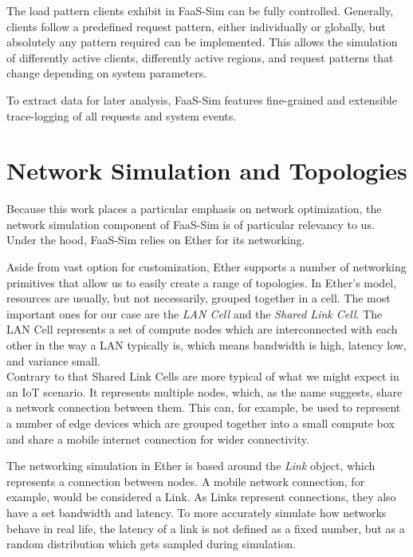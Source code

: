 \documentclass[draft,final]{vutinfth} %
\begin{document}
The load pattern clients exhibit in FaaS-Sim can be fully controlled.
Generally, clients follow a predefined request pattern, either individually or globally, but absolutely any pattern required can be implemented.
This allows the simulation of differently active clients, differently active regions, and request patterns that change depending on system parameters.

To extract data for later analysis, FaaS-Sim features fine-grained and extensible trace-logging of all requests and system events.
\section{Network Simulation and Topologies}
Because this work places a particular emphasis on network optimization, the network simulation component of FaaS-Sim is of particular relevancy to us.
Under the hood, FaaS-Sim relies on Ether\cite{rausch-ether} for its networking.

Aside from vast option for customization, Ether supports a number of networking primitives that allow us to easily create a range of topologies.
In Ether's model, resources are usually, but not necessarily, grouped together in a cell.
The most important ones for our case are the \textit{LAN Cell} and the \textit{Shared Link Cell}.
The LAN Cell represents a set of compute nodes which are interconnected with each other in the way a LAN typically is, which means bandwidth is high, latency low, and variance small.\\
Contrary to that Shared Link Cells are more typical of what we might expect in an IoT scenario. 
It represents multiple nodes, which, as the name suggests, share a network connection between them.
This can, for example, be used to represent a number of edge devices which are grouped together into a small compute box and share a mobile internet connection for wider connectivity.

The networking simulation in Ether is based around the \textit{Link} object\cite{rausch-ether}, which represents a connection between nodes.
A mobile network connection, for example, would be considered a Link.
As Links represent connections, they also have a set bandwidth and latency.
To more accurately simulate how networks behave in real life, the latency of a link is not defined as a fixed number, but as a random distribution which gets sampled during simulation.

\end{document}
